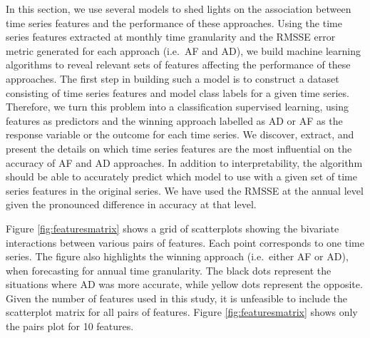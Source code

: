 \documentclass[preprint, 3p,
authoryear]{elsarticle} %
\begin{document}
In this section, we use several models to shed lights on the association
between time series features and the performance of these approaches.
Using the time series features extracted at monthly time granularity and
the RMSSE error metric generated for each approach (i.e.~AF and AD), we
build machine learning algorithms to reveal relevant sets of features
affecting the performance of these approaches. The first step in
building such a model is to construct a dataset consisting of time
series features and model class labels for a given time series.
Therefore, we turn this problem into a classification supervised
learning, using features as predictors and the winning approach labelled
as AD or AF as the response variable or the outcome for each time
series. We discover, extract, and present the details on which time
series features are the most influential on the accuracy of AF and AD
approaches. In addition to interpretability, the algorithm should be
able to accurately predict which model to use with a given set of time
series features in the original series. We have used the RMSSE at the
annual level given the pronounced difference in accuracy at that level.

Figure \ref{fig:featuresmatrix} shows a grid of scatterplots showing the
bivariate interactions between various pairs of features. Each point
corresponds to one time series. The figure also highlights the winning
approach (i.e.~either AF or AD), when forecasting for annual time
granularity. The black dots represent the situations where AD was more
accurate, while yellow dots represent the opposite. Given the number of
features used in this study, it is unfeasible to include the scatterplot
matrix for all pairs of features. Figure \ref{fig:featuresmatrix} shows
only the pairs plot for 10 features.
\end{document}
